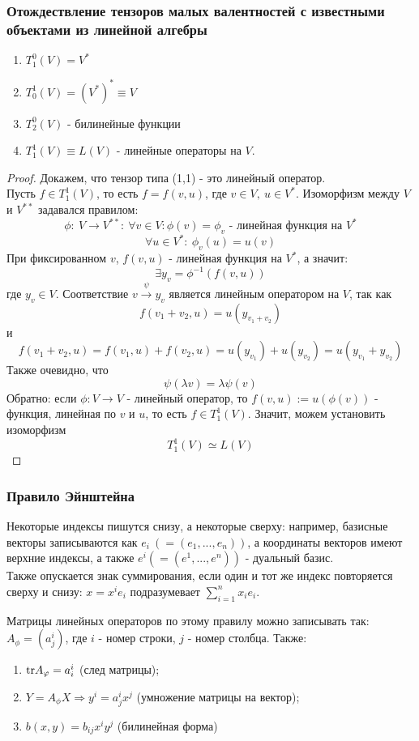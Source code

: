 \subsubsection*{Отождествление тензоров малых валентностей с известными объектами из линейной алгебры}
\begin{theorem}\tab
    \begin{enumerate}
        \item $T_1^0(V)=V^*$
        \item $T_0^1(V)=(V^*)^* \equiv V$
        \item $T_2^0(V)$ - билинейные функции
        \item $T_1^1(V) \equiv L(V)$ - линейные операторы на $V$.
    \end{enumerate}
\end{theorem} 
\begin{proof}
    Докажем, что тензор типа (1,1) - это линейный оператор.\\
    Пусть $f\in T_1^1(V)$, то есть $f=f(v,u)$, где $v\in V,\ u\in V^*$. Изоморфизм между $V$ и $V^{**}$ задавался правилом:
    \[ \phi: \ V \to V^{**}: \ \forall v\in V: \phi(v) = \phi_v \text{ - линейная функция на } V^*\]
    \[ \forall u\in V^*: \ \phi_v(u)=u(v)\]
    При фиксированном $v$, $f(v,u)$ - линейная функция на $V^*$, а значит:
    \[\exists y_v = \phi^{-1}(f(v, u))\]
    где $y_v\in V$. Соответствие $v\xrightarrow{\psi} y_v$ является линейным оператором на $V$, так как 
    \[f(v_1+v_2,u)=u(y_{v_1+v_2})\]
    и 
    \[f(v_1+v_2,u)=f(v_1,u)+f(v_2,u)=u(y_{v_1})+u(y_{v_2})=u(y_{v_1}+y_{v_2})\]
    Также очевидно, что 
    \[\psi(\lambda v)=\lambda\psi(v)\]
    Обратно: если $\phi: V\to V$ - линейный оператор, то $f(v,u):=u(\phi(v))$ - функция, линейная по $v$ и $u$, то есть $f\in T^1_1(V)$. Значит, можем установить изоморфизм
    \[T_1^1(V)\simeq L(V)\]
\end{proof}  
\subsubsection*{Правило Эйнштейна}
Некоторые индексы пишутся снизу, а некоторые сверху: например, базисные векторы записываются как $e_i \ (= (e_1,...,e_n))$, а координаты векторов имеют верхние индексы, а также $e^i (=(e^1,...,e^n))$ - дуальный базис.\\
Также опускается знак суммирования, если один и тот же индекс повторяется сверху и снизу: $x = x^ie_i$ подразумевает $\sum \limits_{i=1}^n x_ie_i$.

Матрицы линейных операторов по этому правилу можно записывать так: $A_\phi = (a_j^i)$, где $i$ - номер строки, $j$ - номер столбца. Также:
\begin{enumerate}
    \item $\textup{tr} A_\phi = a_i^i$ (след матрицы);
    \item $Y = A_\phi X \Longrightarrow y^i = a_j^ix^j$ (умножение матрицы на вектор);
    \item $b(x, y) = b_{ij}x^iy^j$ (билинейная форма)
\end{enumerate}

